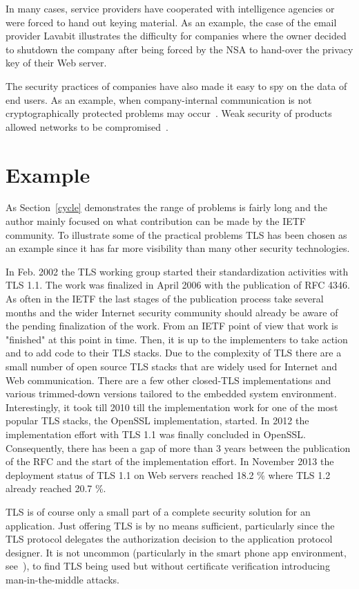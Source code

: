 \documentclass[peerreview, a4paper, 7pt]{IEEEtran}
\begin{document}
In many cases, service providers have cooperated with intelligence agencies or were forced to hand out keying material. As an example, the case of the email provider Lavabit illustrates the difficulty for companies where the owner decided to shutdown the company after being forced by the NSA to hand-over the privacy key of their Web server. 

The security practices of companies have also made it easy to spy on the data of end users. As an example, when company-internal communication is not cryptographically protected problems may occur~\cite{Greenwald,Gellman}. Weak security of products allowed networks to be compromised~\cite{Zetter}.

\section{Example}

As Section~\ref{cycle} demonstrates the range of problems is fairly long and the author mainly focused on what contribution can be made by the IETF community. To illustrate some of the practical problems TLS has been chosen as an example since it has far more visibility than many other security technologies. 

In Feb. 2002 the TLS working group started their standardization activities with TLS 1.1. The work was finalized in April 2006 with the publication of RFC 4346. As often in the IETF the last stages of the publication process take several months and the wider Internet security community should already be aware of the pending finalization of the work. From an IETF point of view that work is "finished" at this point in time. Then, it is up to the implementers to take action and to add code to their TLS stacks. Due to the complexity of TLS there are a small number of open source TLS stacks that are widely used for Internet and Web communication. There are a few other closed-TLS implementations and various trimmed-down versions tailored to the embedded system environment. Interestingly, it took till 2010 till the implementation work for one of the most popular TLS stacks, the OpenSSL implementation, started. In 2012 the implementation effort with TLS 1.1 was finally concluded in OpenSSL. Consequently, there has been a gap of more than 3 years between the publication of the RFC and the start of the implementation effort. In November 2013 the deployment status of TLS 1.1 on Web servers reached 18.2 \% where TLS 1.2 already reached 20.7 \%. 

TLS is of course only a small part of a complete security solution for an application. Just offering TLS is by no means sufficient, particularly since the TLS protocol delegates the authorization decision to the application protocol designer. It is not uncommon (particularly in the smart phone app environment, see~\cite{GI+02}), to find TLS being used but without certificate verification introducing man-in-the-middle attacks. 
\end{document}
